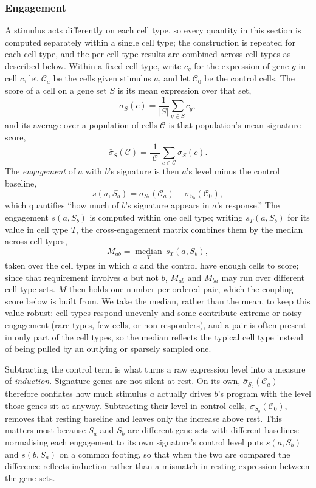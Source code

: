 \documentclass[11pt,a4paper]{article}
\begin{document}
\subsubsection{Engagement}
A stimulus acts differently on each cell type, so every quantity in this section is computed separately within a single cell type; the construction is repeated for each cell type, and the per-cell-type results are combined across cell types as described below. Within a fixed cell type, write $c_g$ for the expression of gene $g$ in cell $c$, let $\mathcal{C}_a$ be the cells given stimulus $a$, and let $\mathcal{C}_0$ be the control cells.
The score of a cell on a gene set $S$ is its mean expression over that set,
\[
  \sigma_S(c)=\frac{1}{|S|}\sum_{g\in S} c_g,
\]
and its average over a population of cells $\mathcal{C}$ is that population's mean signature score,
\[
  \bar\sigma_S(\mathcal{C})=\frac{1}{|\mathcal{C}|}\sum_{c\in\mathcal{C}}\sigma_S(c).
\]
The \emph{engagement} of $a$ with $b$'s signature is then $a$'s level minus the control baseline,
\[
  s(a,S_b)=\bar\sigma_{S_b}(\mathcal{C}_a)-\bar\sigma_{S_b}(\mathcal{C}_0),
\]
which quantifies ``how much of $b$'s signature appears in $a$'s response.''
The engagement $s(a,S_b)$ is computed within one cell type; writing $s_T(a,S_b)$ for its value in cell type $T$, the cross-engagement matrix combines them by the median across cell types,
\[
  M_{ab}=\operatorname*{median}_{T}\, s_T(a,S_b),
\]
taken over the cell types in which $a$ and the control have enough cells to score; since that requirement involves $a$ but not $b$, $M_{ab}$ and $M_{ba}$ may run over different cell-type sets. $M$ then holds one number per ordered pair, which the coupling score below is built from. We take the median, rather than the mean, to keep this value robust: cell types respond unevenly and some contribute extreme or noisy engagement (rare types, few cells, or non-responders), and a pair is often present in only part of the cell types, so the median reflects the typical cell type instead of being pulled by an outlying or sparsely sampled one.

Subtracting the control term is what turns a raw expression level into a measure of \emph{induction}. Signature genes are not silent at rest. On its own, $\bar\sigma_{S_b}(\mathcal{C}_a)$ therefore conflates how much stimulus $a$ actually drives $b$'s program with the level those genes sit at anyway. Subtracting their level in control cells, $\bar\sigma_{S_b}(\mathcal{C}_0)$, removes that resting baseline and leaves only the increase above rest. This matters most because $S_a$ and $S_b$ are different gene sets with different baselines: normalising each engagement to its own signature's control level puts $s(a,S_b)$ and $s(b,S_a)$ on a common footing, so that when the two are compared the difference reflects induction rather than a mismatch in resting expression between the gene sets.
\end{document}
